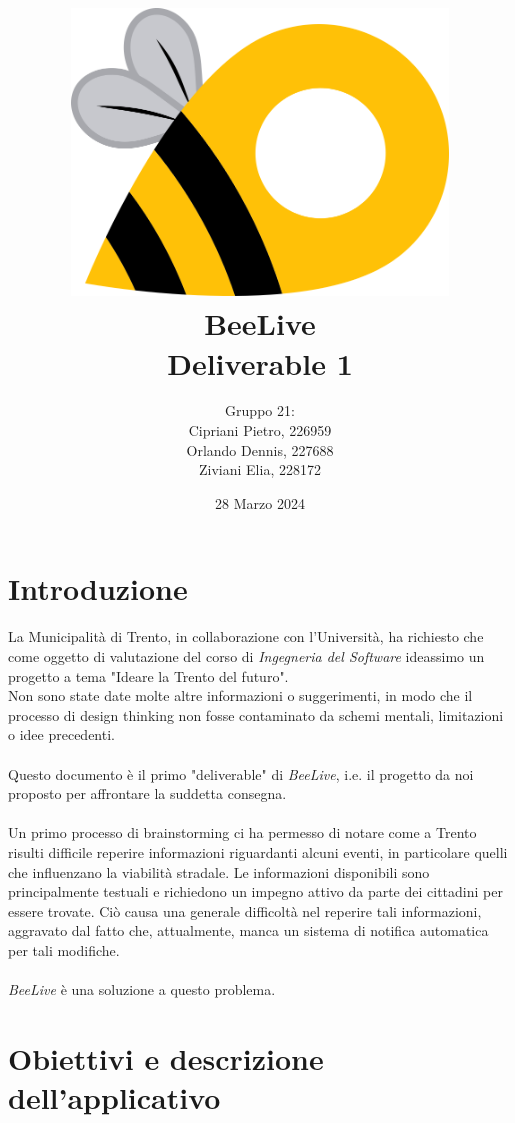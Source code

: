\documentclass{article}
\title{\includegraphics[width=0.75\textwidth]{Images/BeeLive-Logo.png}\\\vspace{100pt}
\LARGE{\textbf{BeeLive\\Deliverable 1}}}
\author{Gruppo 21:\\
Cipriani Pietro, 226959\\
Orlando Dennis, 227688\\
Ziviani Elia, 228172}
\date{28 Marzo 2024}
\begin{document}
\maketitle
\thispagestyle{firstpage} %
\clearpage

\pagestyle{nonplain} %

\renewcommand{\contentsname}{Indice}
\tableofcontents

\clearpage
\section{Introduzione}

La Municipalità di Trento, in collaborazione con l'Università, ha richiesto che come oggetto di valutazione del corso di \textit{Ingegneria del Software} ideassimo un progetto a tema "Ideare la Trento del futuro".\\
Non sono state date molte altre informazioni o suggerimenti, in modo che il processo di design thinking non fosse contaminato da schemi mentali, limitazioni o idee precedenti. \\
\\
Questo documento è il primo "deliverable" di \textit{BeeLive}, i.e. il progetto da noi proposto per affrontare la suddetta consegna. \\
\\
Un primo processo di brainstorming ci ha permesso di notare come a Trento risulti difficile reperire informazioni riguardanti alcuni eventi, in particolare quelli che influenzano la viabilità stradale. Le informazioni disponibili sono principalmente testuali e richiedono un impegno attivo da parte dei cittadini per essere trovate.
Ciò causa una generale difficoltà nel reperire tali informazioni, aggravato dal fatto che, attualmente, manca un sistema di notifica automatica per tali modifiche.\\
\\
\textit{BeeLive} è una soluzione a questo problema. 


\section{Obiettivi e descrizione dell'applicativo}
\end{document}
